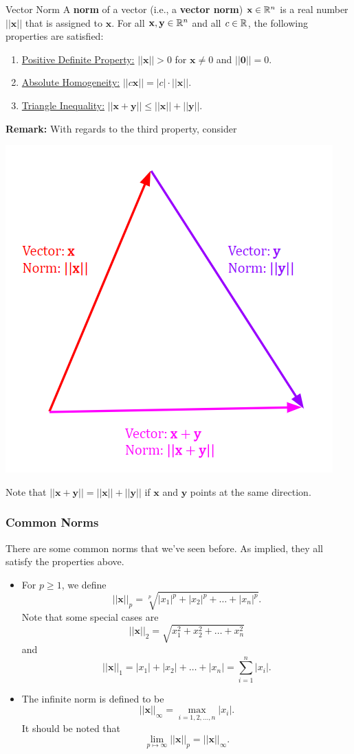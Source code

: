 \documentclass[letterpaper]{article}
\newcommand{\0}{\mathbf{0}}
\newcommand{\y}{\mathbf{y}}
\newcommand{\x}{\mathbf{x}}
\begin{document}
\begin{definition}{Vector Norm}{}
    A \textbf{norm} of a vector (i.e., a \textbf{vector norm}) $\x \in \R^n$ is a real number $||\x||$ that is assigned to $\x$. For all $\x, \y \in \R^n$ and all $c \in \mathbb{R}$, the following properties are satisfied: 
    \begin{enumerate}
        \item \underline{Positive Definite Property:} $||\x|| > 0$ for $\x \neq 0$ and $||\0|| = 0$. 
        \item \underline{Absolute Homogeneity:} $||c\x|| = |c| \cdot ||\x||$. 
        \item \underline{Triangle Inequality:} $||\x + \y|| \leq ||\x|| + ||\y||$. 
    \end{enumerate}
\end{definition}
\textbf{Remark:} With regards to the third property, consider \begin{center}
    \includegraphics[scale=0.6]{assets/tri_inequality.png}
\end{center}
Note that $||\x + \y|| = ||\x|| + ||\y||$ if $\x$ and $\y$ points at the same direction.

\subsubsection{Common Norms}
There are some common norms that we've seen before. As implied, they all satisfy the properties above. 
\begin{itemize}
    \item For $p \geq 1$, we define 
    \[||\x||_p = \sqrt[p]{|x_1|^p + |x_2|^p + \hdots + |x_n|^p}.\]
    Note that some special cases are 
    \[||\x||_2 = \sqrt{x_1^2 + x_2^2 + \hdots + x_n^2}\]
    and 
    \[||\x||_1 = |x_1| + |x_2| + \hdots + |x_n| = \sum_{i = 1}^{n} |x_i|.\]

    \item The infinite norm is defined to be \[||\x||_{\infty} = \max_{i = 1, 2, \hdots, n} |x_i|.\] It should be noted that \[\lim_{p \mapsto \infty} ||\x||_p = ||\x||_{\infty}.\]
\end{itemize}
\end{document}
